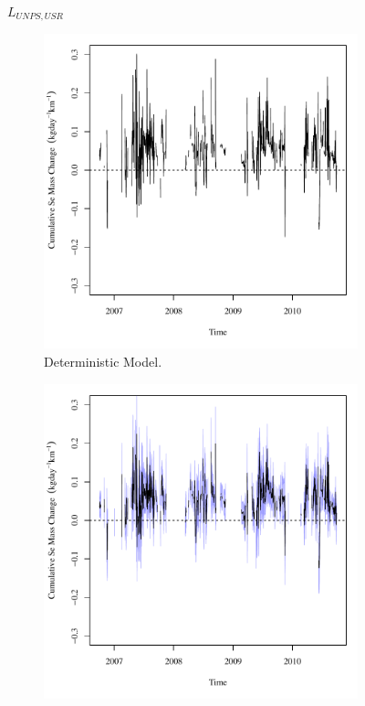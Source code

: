 \subfiguretop
\begin{landscape}
	\begin{figure}
		$ \displaystyle L_{UNPS,USR} $
		\begin{subfigure}{0.7\textwidth}
			\centering
			\includegraphics[width=\tableCustomSize]{"Figures/Results_USR/Deterministic/Balance Mass"}
			\caption{Deterministic Model.}
		\end{subfigure}%
		\begin{subfigure}{0.7\textwidth}
			\centering
			\includegraphics[width=\tableCustomSize]{"Figures/Results_USR/Stochastic/Balance Mass"}

\end{subfigure}
\end{figure}
\end{landscape}
